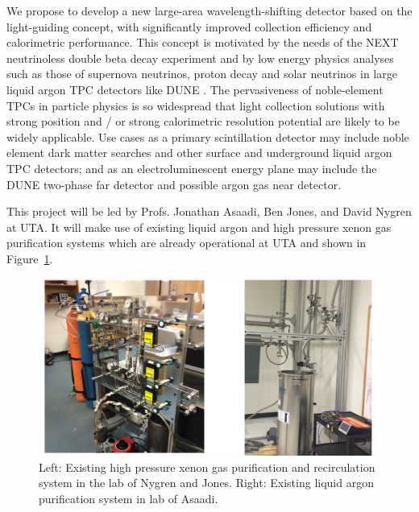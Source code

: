 We propose to develop a new large-area wavelength-shifting detector based on the light-guiding concept, with significantly improved collection efficiency and calorimetric performance.  This concept is motivated by the needs of the NEXT neutrinoless double beta decay experiment \cite{Mart} and by low energy physics analyses such as those of supernova neutrinos, proton decay and solar neutrinos in large liquid argon TPC detectors like DUNE \cite{Ankowski:2016lab,Kudryavtsev:2016ybl}. The pervasiveness of noble-element TPCs in particle physics is so widespread that light collection solutions with strong position and / or strong calorimetric resolution potential are likely to be widely applicable.  Use cases as a primary scintillation detector may include noble element dark matter searches and other surface and underground liquid argon TPC detectors; and as an electroluminescent energy plane may include the DUNE two-phase far detector and possible argon gas near detector.


This project will be led by Profs. Jonathan Asaadi, Ben Jones, and David Nygren at UTA.  It will make use of existing liquid argon and high pressure xenon gas purification systems which are already operational at UTA and shown in Figure~\ref{fig:ExistingGasSystems}.  


\begin{figure}[t]
\begin{centering}
\includegraphics[width=0.90\columnwidth]{./images/PhotosOfLabs.pdf}
\par\end{centering}

\caption{Left: Existing high pressure xenon gas purification and recirculation system in the lab of Nygren and Jones.  Right: Existing liquid argon purification system in lab of Asaadi. \label{fig:ExistingGasSystems}}
\end{figure}

